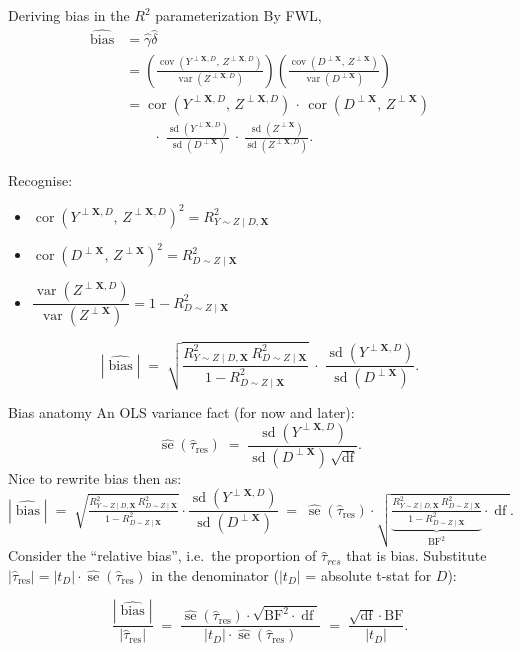 \documentclass[xcolor=dvipsnames]{beamer}
\newcommand\X{{\bm X}}
\DeclareMathOperator{\var}{var}
\DeclareMathOperator{\cov}{cov}
\DeclareMathOperator{\cor}{cor}
\DeclareMathOperator{\sd}{sd}
\DeclareMathOperator{\se}{se}
\DeclareMathOperator{\df}{df}
\DeclareMathOperator{\bias}{bias}
\begin{document}
\begin{frame}{Deriving bias in the $R^2$ parameterization}
\footnotesize
{} By FWL,
\begin{align*}
\widehat{\bias} &= \hat{\gamma}\hat{\delta} \\
&= \left(\frac{\cov(Y^{\perp \X, D},\, Z^{\perp \X, D})}{\var(Z^{\perp \X, D})}\right) \left(\frac{\cov(D^{\perp \X},\, Z^{\perp \X})}{\var(D^{\perp \X})}\right) \\
&= \cor(Y^{\perp \X,D},\, Z^{\perp \X,D})\,\cdot\, \cor(D^{\perp \X},\, Z^{\perp \X}) \\[-2pt]
&\qquad\cdot\;  \frac{\sd(Y^{\perp \X,D})}{\sd(D^{\perp \X})} \,\cdot\,  \frac{\sd(Z^{\perp \X})}{\sd(Z^{\perp \X,D})}.
\end{align*}

 Recognise:
\begin{itemize}
\item $\cor(Y^{\perp \X,D},\, Z^{\perp \X,D})^2 = R^2_{Y\sim Z \mid D, \X}$
\item $\cor(D^{\perp \X},\, Z^{\perp \X})^2 = R^2_{D\sim Z \mid \X}$
\item $\dfrac{\var(Z^{\perp \X,D})}{\var(Z^{\perp \X})} = 1 - R^2_{D\sim Z \mid \X}$
\end{itemize}

\normalsize
\[
\boxed{\;|\widehat{\bias}| \;=\; \sqrt{\frac{R^2_{Y\sim Z \mid D, \X}\, R^2_{D\sim Z \mid \X}}{1 - R^2_{D\sim Z \mid \X}}}\;
\cdot\; \frac{\sd(Y^{\perp \X, D})}{\sd(D^{\perp \X})}.\;}
\]
\end{frame}


\begin{frame}{Bias anatomy}
\small
{} An OLS variance fact (for now and later):
\[
\widehat{\se}(\hat{\tau}_{\text{res}}) \;=\; \frac{\sd(Y^{\perp \X, D})}{\sd(D^{\perp \X})\,\sqrt{\df}}.
\]
 Nice to rewrite bias then as:
\[
|\widehat{\bias}| \;=\; \sqrt{\tfrac{R^2_{Y\sim Z \mid D,\X}\, R^2_{D\sim Z \mid \X}}{1 - R^2_{D\sim Z \mid \X}}}\cdot \frac{\sd(Y^{\perp \X, D})}{\sd(D^{\perp \X})}
\;=\; \widehat{\se}(\hat{\tau}_{\text{res}}) \cdot \sqrt{\underbrace{\tfrac{R^2_{Y\sim Z \mid D,\X}\, R^2_{D\sim Z \mid \X}}{1 - R^2_{D\sim Z \mid \X}}}_{\text{BF}^2} \cdot \df}.
\]
 Consider the ``relative bias'', i.e.\ the proportion of $\hat{\tau}_{res}$ that is bias.  Substitute $|\hat{\tau}_{\text{res}}| = |t_D|\cdot \widehat{\se}(\hat{\tau}_{\text{res}})$ in the denominator ($|t_D|$ = absolute t-stat for $D$):

\[ \frac{|\widehat{\bias}|}{|\hat{\tau}_{\text{res}}|} \;=\; \frac{\widehat{\se}(\hat{\tau}_{\text{res}})\cdot \sqrt{\text{BF}^2\cdot \df}}{|t_D|\cdot \widehat{\se}(\hat{\tau}_{\text{res}})} \;=\; \frac{\sqrt{\df}\cdot \text{BF}}{|t_D|}. \]
\end{frame}
\end{document}
